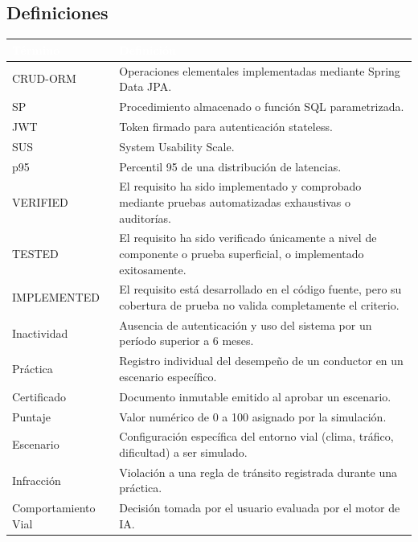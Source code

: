 \documentclass[11pt,a4paper]{article}
\begin{document}
\subsection{Definiciones}
\begin{table}[h]
    \centering
    \renewcommand{\arraystretch}{1.3}
    \begin{tabularx}{\textwidth}{@{}|l|X|@{}}
        \hline
        \rowcolor{uteqblue}
        \textcolor{white}{\textbf{Término}} & \textcolor{white}{\textbf{Definición}} \\ \hline
        CRUD-ORM & Operaciones elementales implementadas mediante Spring Data JPA. \\ \hline
        SP & Procedimiento almacenado o función SQL parametrizada. \\ \hline
        JWT & Token firmado para autenticación stateless. \\ \hline
        SUS & System Usability Scale. \\ \hline
        p95 & Percentil 95 de una distribución de latencias. \\ \hline
        VERIFIED & El requisito ha sido implementado y comprobado mediante pruebas automatizadas exhaustivas o auditorías. \\ \hline
        TESTED & El requisito ha sido verificado únicamente a nivel de componente o prueba superficial, o implementado exitosamente. \\ \hline
        IMPLEMENTED & El requisito está desarrollado en el código fuente, pero su cobertura de prueba no valida completamente el criterio. \\ \hline
        Inactividad & Ausencia de autenticación y uso del sistema por un período superior a 6 meses. \\ \hline
        Práctica & Registro individual del desempeño de un conductor en un escenario específico. \\ \hline
        Certificado & Documento inmutable emitido al aprobar un escenario. \\ \hline
        Puntaje & Valor numérico de 0 a 100 asignado por la simulación. \\ \hline
        Escenario & Configuración específica del entorno vial (clima, tráfico, dificultad) a ser simulado. \\ \hline
        Infracción & Violación a una regla de tránsito registrada durante una práctica. \\ \hline
        Comportamiento Vial & Decisión tomada por el usuario evaluada por el motor de IA. \\ \hline
    \end{tabularx}
\end{table}
\end{document}
